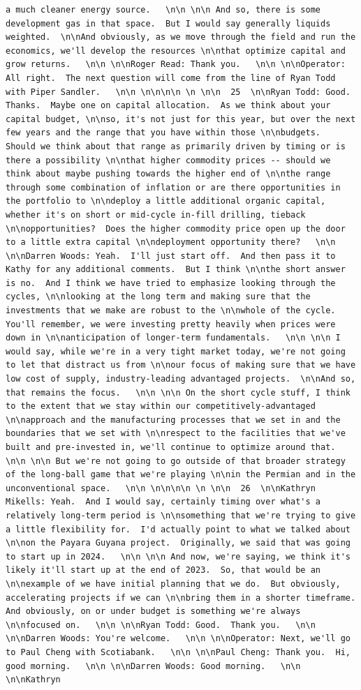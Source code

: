 \documentclass[
  letterpaper,
  DIV=11,
  numbers=noendperiod]{scrreprt}
\begin{document}
\begin{verbatim}
a much cleaner energy source.   \n\n \n\n And so, there is some development gas in that space.  But I would say generally liquids weighted.  \n\nAnd obviously, as we move through the field and run the economics, we'll develop the resources \n\nthat optimize capital and grow returns.   \n\n \n\nRoger Read: Thank you.   \n\n \n\nOperator: All right.  The next question will come from the line of Ryan Todd with Piper Sandler.   \n\n \n\n\n\n \n \n\n  25  \n\nRyan Todd: Good.  Thanks.  Maybe one on capital allocation.  As we think about your capital budget, \n\nso, it's not just for this year, but over the next few years and the range that you have within those \n\nbudgets.  Should we think about that range as primarily driven by timing or is there a possibility \n\nthat higher commodity prices -- should we think about maybe pushing towards the higher end of \n\nthe range through some combination of inflation or are there opportunities in the portfolio to \n\ndeploy a little additional organic capital, whether it's on short or mid-cycle in-fill drilling, tieback \n\nopportunities?  Does the higher commodity price open up the door to a little extra capital \n\ndeployment opportunity there?   \n\n \n\nDarren Woods: Yeah.  I'll just start off.  And then pass it to Kathy for any additional comments.  But I think \n\nthe short answer is no.  And I think we have tried to emphasize looking through the cycles, \n\nlooking at the long term and making sure that the investments that we make are robust to the \n\nwhole of the cycle.  You'll remember, we were investing pretty heavily when prices were down in \n\nanticipation of longer-term fundamentals.   \n\n \n\n I would say, while we're in a very tight market today, we're not going to let that distract us from \n\nour focus of making sure that we have low cost of supply, industry-leading advantaged projects.  \n\nAnd so, that remains the focus.   \n\n \n\n On the short cycle stuff, I think to the extent that we stay within our competitively-advantaged \n\napproach and the manufacturing processes that we set in and the boundaries that we set with \n\nrespect to the facilities that we've built and pre-invested in, we'll continue to optimize around that.   \n\n \n\n But we're not going to go outside of that broader strategy of the long-ball game that we're playing \n\nin the Permian and in the unconventional space.   \n\n \n\n\n\n \n \n\n  26  \n\nKathryn Mikells: Yeah.  And I would say, certainly timing over what's a relatively long-term period is \n\nsomething that we're trying to give a little flexibility for.  I'd actually point to what we talked about \n\non the Payara Guyana project.  Originally, we said that was going to start up in 2024.   \n\n \n\n And now, we're saying, we think it's likely it'll start up at the end of 2023.  So, that would be an \n\nexample of we have initial planning that we do.  But obviously, accelerating projects if we can \n\nbring them in a shorter timeframe.  And obviously, on or under budget is something we're always \n\nfocused on.   \n\n \n\nRyan Todd: Good.  Thank you.   \n\n \n\nDarren Woods: You're welcome.   \n\n \n\nOperator: Next, we'll go to Paul Cheng with Scotiabank.   \n\n \n\nPaul Cheng: Thank you.  Hi, good morning.   \n\n \n\nDarren Woods: Good morning.   \n\n \n\nKathryn 
\end{verbatim}
\end{document}
